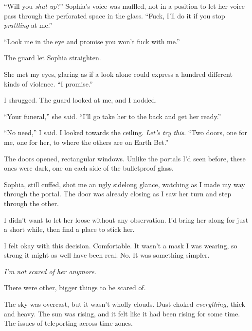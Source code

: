 ``Will you\emph{ shut up}?''  Sophia's voice was muffled, not in a position to let her voice pass through the perforated space in the glass.  ``Fuck, I'll do it if you stop \emph{prattling} at me.''



``Look me in the eye and promise you won't fuck with me.''



The guard let Sophia straighten.



She met my eyes, glaring as if a look alone could express a hundred different kinds of violence.  ``I promise.''



I shrugged.  The guard looked at me, and I nodded.



``Your funeral,'' she said.  ``I'll go take her to the back and get her ready.''



``No need,'' I said.  I looked towards the ceiling.  \emph{Let's try this}.  ``Two doors, one for me, one for her, to where the others are on Earth Bet.''



The doors opened, rectangular windows.  Unlike the portals I'd seen before, these ones were dark, one on each side of the bulletproof glass.



Sophia, still cuffed, shot me an ugly sidelong glance, watching as I made my way through the portal.  The door was already closing as I saw her turn and step through the other.



I didn't want to let her loose without any observation.  I'd bring her along for just a short while, then find a place to stick her.



I felt okay with this decision.  Comfortable.  It wasn't a mask I was wearing, so strong it might as well have been real.  No.  It was something simpler.



\emph{I'm not scared of her anymore.}



\sectionbreak



There were other, bigger things to be scared of.



The sky was overcast, but it wasn't wholly clouds.  Dust choked \emph{everything,} thick and heavy.  The sun was rising, and it felt like it had been rising for some time.  The issues of teleporting across time zones.




